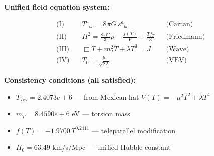 
\textbf{Unified field equation system:}

\begin{align}
  \text{(I)} \quad & T^a{}_{bc} = 8\pi G \, s^a{}_{bc} && \text{(Cartan)} \\
  \text{(II)} \quad & H^2 = \frac{8\pi G}{3}\rho - \frac{f(T)}{6} + \frac{Tf_T}{3} && \text{(Friedmann)} \\
  \text{(III)} \quad & \Box T + m_T^2 T + \lambda T^3 = J && \text{(Wave)} \\
  \text{(IV)} \quad & T_0 = \frac{\mu}{\sqrt{2\lambda}} && \text{(VEV)}
\end{align}

\textbf{Consistency conditions (all satisfied):}
\begin{itemize}
  \item $T_{\text{vev}} = 2.4073e+6$ — from Mexican hat $V(T) = -\mu^2 T^2 + \lambda T^4$
  \item $m_T = 8.4590e+6$ eV — torsion mass
  \item $f(T) = -1.9700 \, T^{0.2411}$ — teleparallel modification
  \item $H_0 = 63.49$ km/s/Mpc — unified Hubble constant
\end{itemize}
